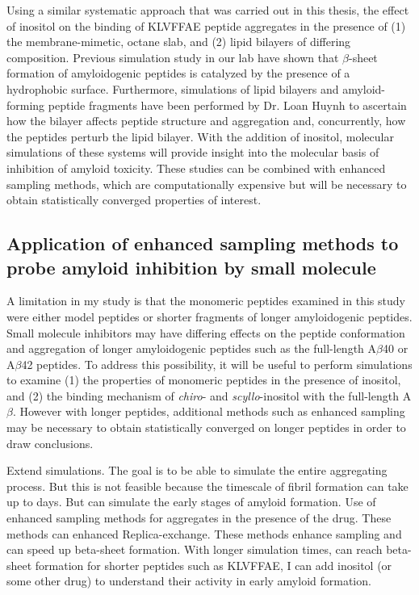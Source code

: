Using a similar systematic approach that was carried out in this thesis, the effect of inositol on the binding of KLVFFAE peptide aggregates in the presence of (1) the membrane-mimetic, octane slab, and (2) lipid bilayers of differing composition. Previous simulation study in our lab have shown that $\beta$-sheet formation of amyloidogenic peptides is catalyzed by the presence of a hydrophobic surface.\cite{Nikolic:2010go} Furthermore, simulations of lipid bilayers and amyloid-forming peptide fragments have been performed by Dr. Loan Huynh to ascertain how the bilayer affects peptide structure and aggregation and, concurrently, how the peptides perturb the lipid bilayer. With the addition of inositol, molecular simulations of these systems will provide insight into the  molecular basis of inhibition of amyloid toxicity. These studies can be combined with enhanced sampling methods,\cite{TVREX, STDR} which are computationally expensive but will be necessary to obtain statistically converged properties of interest.

\subsection{Application of enhanced sampling methods to probe amyloid inhibition by small molecule}
A limitation in my study is that the monomeric peptides examined in this study were either model peptides or shorter fragments of longer amyloidogenic peptides. Small molecule inhibitors may have differing effects on the peptide conformation and aggregation of longer amyloidogenic peptides such as the full-length A$\beta$40 or A$\beta$42 peptides. To address this possibility, it will be useful to perform simulations to examine (1) the properties of monomeric peptides in the presence of inositol, and (2) the binding mechanism of \textit{chiro}- and \textit{scyllo}-inositol with the full-length A$\beta$. However with longer peptides, additional methods such as enhanced sampling may be necessary to obtain statistically converged on longer peptides in order to draw conclusions.

Extend simulations. The goal is to be able to simulate the entire aggregating process.  But this is not feasible because the timescale of fibril formation can take up to days. But can simulate the early stages of amyloid formation.  Use of enhanced sampling methods for aggregates in the presence of the drug.  These methods can enhanced Replica-exchange.  These methods enhance sampling and can speed up beta-sheet formation. With longer simulation times, can reach beta-sheet formation for shorter peptides such as KLVFFAE, I can add inositol (or some other drug) to understand their activity in early amyloid formation.

